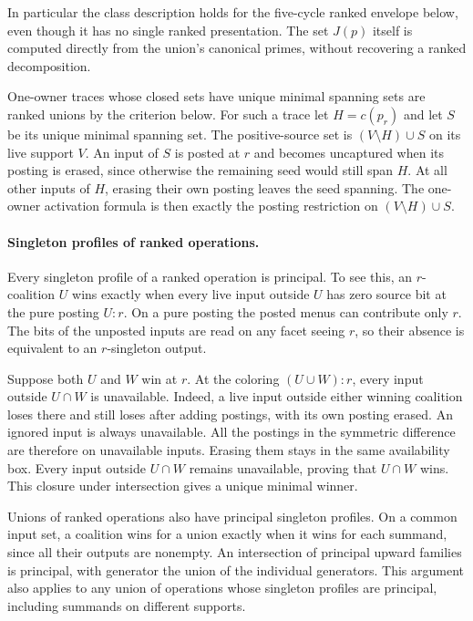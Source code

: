 In particular the class description holds for the
five-cycle ranked envelope below, even though it has
no single ranked presentation. The set $J(p)$ itself
is computed directly from the union's canonical primes,
without recovering a ranked decomposition.

One-owner traces whose closed sets have unique minimal
spanning sets are ranked unions by the criterion below.
For such a trace let $H=c(p_r)$ and let $S$ be its unique
minimal spanning set. The positive-source set is
$(V\setminus H)\cup S$ on its live support $V$.
An input of $S$ is posted at $r$ and becomes uncaptured
when its posting is erased, since otherwise the remaining
seed would still span $H$. At all other inputs of $H$,
erasing their own posting leaves the seed spanning.
The one-owner activation formula is then exactly the
posting restriction on $(V\setminus H)\cup S$.

\paragraph{Singleton profiles of ranked operations.}
Every singleton profile of a ranked operation is principal.
To see this, an $r$-coalition $U$ wins exactly when every live input
outside $U$ has zero source bit at the pure posting $U:r$.
On a pure posting the posted menus can contribute only $r$.
The bits of the unposted inputs are read on any facet seeing $r$,
so their absence is equivalent to an $r$-singleton output.

Suppose both $U$ and $W$ win at $r$. At the coloring
$(U\cup W):r$, every input outside $U\cap W$ is unavailable.
Indeed, a live input outside either winning coalition loses
there and still loses after adding postings, with its own
posting erased. An ignored input is always unavailable.
All the postings in the symmetric difference are therefore
on unavailable inputs. Erasing them stays in the same
availability box. Every input outside $U\cap W$ remains
unavailable, proving that $U\cap W$ wins. This closure under
intersection gives a unique minimal winner.

Unions of ranked operations also have principal singleton profiles.
On a common input set, a coalition wins for a union exactly when
it wins for each summand, since all their outputs are nonempty.
An intersection of principal upward families is principal, with
generator the union of the individual generators. This argument
also applies to any union of operations whose singleton profiles
are principal, including summands on different supports.

